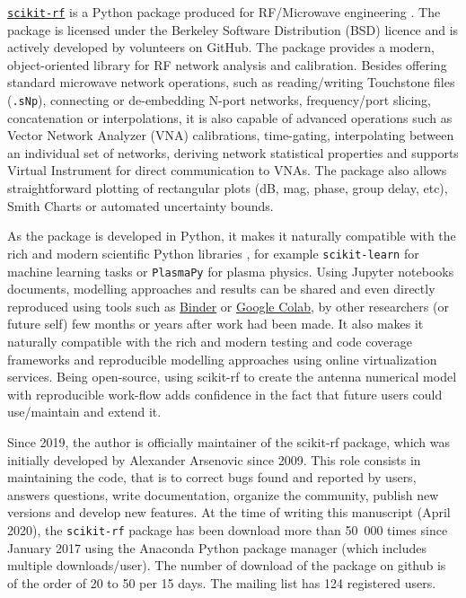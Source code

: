 \href{http://www.scikit-rf.org}{\texttt{scikit-rf}} is a Python package produced for RF/Microwave engineering  . The package is licensed under the Berkeley Software Distribution (BSD) licence and is actively developed by volunteers on GitHub. The package provides a modern, object-oriented library for RF network analysis and calibration. Besides offering standard microwave network operations, such as reading/writing Touchstone files (\texttt{.sNp}), connecting or de-embedding N-port networks, frequency/port slicing, concatenation or interpolations, it is also capable of advanced operations such as Vector Network Analyzer (VNA) calibrations, time-gating, interpolating between an individual set of networks, deriving network statistical properties and supports Virtual Instrument for direct communication to VNAs. The package also allows straightforward plotting of rectangular plots (dB, mag, phase, group delay, etc), Smith Charts or automated uncertainty bounds. 

As the package is developed in Python, it makes it naturally compatible with the rich and modern scientific Python libraries , for example  \texttt{scikit-learn} for machine learning tasks  or \texttt{PlasmaPy}  for plasma physics. Using Jupyter notebooks documents, modelling approaches and results can be shared and even directly reproduced using tools such as \href{https://mybinder.org/}{Binder} or \href{https://colab.research.google.com/}{Google Colab}, by other researchers (or future self) few months or years after work had been made. It also makes it naturally compatible with the rich and modern testing and code coverage frameworks and reproducible modelling approaches using online virtualization services. Being open-source, using scikit-rf to create the antenna numerical model with reproducible work-flow adds confidence
in the fact that future users could use/maintain and extend it.

Since 2019, the author is officially maintainer of the scikit-rf package, which was initially developed by Alexander Arsenovic since 2009. This role consists in maintaining the code, that is to correct bugs found and reported by users, answers questions, write documentation, organize the community, publish new versions and develop new features. At the time of writing this manuscript (April 2020), the \texttt{scikit-rf} package has been download more than 50~000 times since January 2017 using the Anaconda Python package manager (which includes multiple downloads/user). The number of download of the package on github is of the order of 20 to 50 per 15 days. The mailing list has 124 registered users.